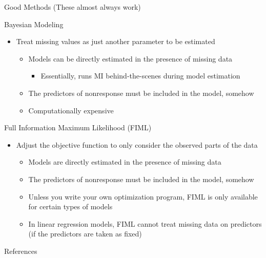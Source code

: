 \documentclass{beamer}\usepackage[]{graphicx}\usepackage[]{color}
\begin{document}
\watermarkon %

\begin{frame}[allowframebreaks]{Good Methods (These almost always work)}

  Bayesian Modeling
  \vc
  \begin{itemize}
  \item Treat missing values as just another parameter to be estimated
    \vc
    \begin{itemize}
    \item Models can be directly estimated in the presence of missing data
      \begin{itemize}
      \item Essentially, runs MI behind-the-scenes during model estimation
      \end{itemize}
      \vc
    \item The predictors of nonresponse must be included in the model, somehow
      \vc
    \item Computationally expensive
    \end{itemize}
  \end{itemize}

  \pagebreak

  Full Information Maximum Likelihood (FIML)
  \vc
  \begin{itemize}
  \item Adjust the objective function to only consider the observed parts of the
    data
    \vc
    \begin{itemize}
    \item Models are directly estimated in the presence of missing data
      \vc
    \item The predictors of nonresponse must be included in the model, somehow
      \vc
    \item Unless you write your own optimization program, FIML is only available
      for certain types of models
      \vc
    \item In linear regression models, FIML cannot treat missing data on
      predictors (if the predictors are taken as fixed)
    \end{itemize}
  \end{itemize}

\end{frame}


\begin{frame}[allowframebreaks]{References}

  
  

\end{frame}

\end{document}
